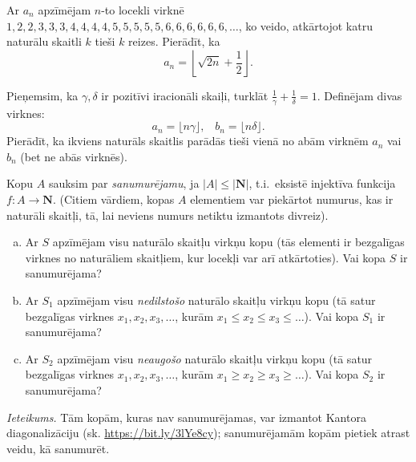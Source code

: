 \documentclass[a4paper,12pt]{article}
\newcommand\N{\mathbf{N}}
\begin{document}
\vspace{10pt}
\begin{problem}
Ar $a_n$ apzīmējam $n$-to locekli virknē\\ $1, 2,2, 3,3,3, 4,4,4,4, 5,5,5,5,5, 6,6,6,6,6,6,\ldots$, 
ko veido, atkārtojot katru naturālu skaitli $k$ tieši $k$ reizes. Pierādīt, ka
\[ a_n = \left\lfloor \sqrt{2n} + \frac{1}{2} \right\rfloor. \]
\end{problem}

\vspace{10pt}
\begin{problem}
Pieņemsim, ka  $\gamma, \delta$ ir pozitīvi iracionāli skaiļi, turklāt ${\displaystyle \frac{1}{\gamma}+\frac{1}{\delta}=1}$. Definējam divas virknes:
\[ a_n=\lfloor n\gamma \rfloor,\;\;\; b_n =\lfloor n\delta\rfloor. \] 
Pierādīt, ka ikviens naturāls skaitlis parādās tieši vienā no abām virknēm $a_n$ vai $b_n$ (bet ne abās virknēs).
\end{problem}

\vspace{10pt}
\begin{problem} Kopu $A$ sauksim par {\em sanumurējamu}, ja $|A| \leq |\N|$, t.i.\ eksistē injektīva funkcija $f: A \rightarrow \N$. 
(Citiem vārdiem, kopas $A$ elementiem var piekārtot numurus, kas ir naturāli skaitļi, tā, lai neviens numurs netiktu izmantots divreiz). 
\begin{enumerate}[(a)]
\item Ar $S$ apzīmējam visu naturālo skaitļu virkņu kopu (tās elementi ir bezgalīgas virknes no naturāliem skaitļiem, kur locekļi var arī atkārtoties). 
Vai kopa $S$ ir sanumurējama?
\item Ar $S_1$ apzīmējam visu {\em nedilstošo} naturālo skaitļu virkņu kopu (tā satur bezgalīgas virknes $x_1,x_2,x_3,\ldots$, kurām 
$x_1 \leq x_2 \leq x_3 \leq \ldots$). Vai kopa $S_1$ ir sanumurējama?
\item Ar $S_2$ apzīmējam visu {\em neaugošo} naturālo skaitļu virkņu kopu (tā satur bezgalīgas virknes $x_1,x_2,x_3,\ldots$, kurām 
$x_1 \geq x_2 \geq x_3 \geq \ldots$). Vai kopa $S_2$ ir sanumurējama?
\end{enumerate}
{\em Ieteikums.} Tām kopām, kuras nav sanumurējamas, var izmantot Kantora diagonalizāciju (sk. \url{https://bit.ly/3lYe8cy}); 
sanumurējamām kopām pietiek atrast veidu, kā sanumurēt.
\end{problem}
\end{document}
